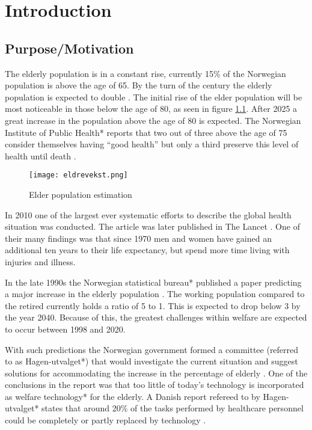 
\chapter{Introduction} %
\label{chapter1} %

\section{Purpose/Motivation}
The elderly population is in a constant rise, currently 15\% of the Norwegian population is above the age of 65. By the turn of the century the elderly population is expected to double \cite{elder}. The initial rise of the elder population will be most noticeable in those below the age of 80, as seen in figure \ref{fig:elderPopulation}. After 2025 a great increase in the population above the age of 80 is expected. The Norwegian Institute of Public Health* reports that two out of three above the age of 75 consider themselves having ``good health'' but only a third preserve this level of health until death \cite{elder}.

\begin{figure}[h!]
	\centering	
		\texttt{[image: eldrevekst.png]}
		\caption{\footnotesize Elder population estimation \cite{elder}}
		\label{fig:elderPopulation}
\end{figure}
In 2010 one of the largest ever systematic efforts to describe the global health situation was conducted. The article was later published in The Lancet \cite{globalBurden}. One of their many findings was that since 1970 men and women have gained an additional ten years to their life expectancy, but spend more time living with injuries and illness. %

In the late 1990s the Norwegian statistical bureau* published a paper predicting a major increase in the elderly population \cite{eldreEksplosjon}. The working population compared to the retired currently holds a ratio of 5 to 1. This is expected to drop below 3 by the year 2040. Because of this, the greatest challenges within welfare are expected to occur between 1998 and 2020. 

With such predictions the Norwegian government formed a committee (referred to as Hagen-utvalget*) that would investigate the current situation and suggest solutions for accommodating the increase in the percentage of elderly \cite{haagen}. One of the conclusions in the report was that too little of today's technology is incorporated as welfare technology* for the elderly. A Danish report refereed to by Hagen-utvalget* states that around 20\% of the tasks performed by healthcare personnel could be completely or partly replaced by technology \cite{kmd}. 

